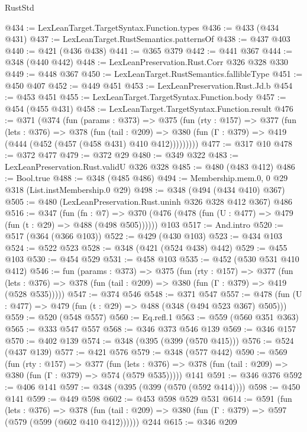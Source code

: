 \begin{lexlean}{RustStd}
\begin{coremodule}
@434 := LexLeanTarget.TargetSyntax.Function.types
@436 := @433 (@434 @431)
@437 := LexLeanTarget.RustSemantics.patternsOf
@438 := @437 @403
@440 := @421 (@436 @438)
@441 := @365 @379
@442 := @441 @367
@444 := @348 (@440 @442)
@448 := LexLeanPreservation.Rust.Corr @326 @328 @330
@449 := @448 @367
@450 := LexLeanTarget.RustSemantics.fallibleType
@451 := @450 @407
@452 := @449 @451
@453 := LexLeanPreservation.Rust.Jd.b
@454 := @453 @451
@455 := LexLeanTarget.TargetSyntax.Function.body
@457 := @454 (@455 @431)
@458 := LexLeanTarget.TargetSyntax.Function.result
@476 := @371
    (@374
      (fun (params : @373) =>
      @375
        (fun (rty : @157) =>
        @377
          (fun (lets : @376) =>
          @378
            (fun (tail : @209) =>
            @380 (fun (Γ : @379) => @419 (@444 (@452 (@457 (@458 @431) @410 @412)))))))))
@477 := @317 @10
@478 := @372 @477
@479 := @372 @29
@480 := @349 @322
@483 := LexLeanPreservation.Rust.validU @326 @328
@485 := @480 (@483 @412)
@486 := Bool.true
@488 := @348 (@485 @486)
@494 := Membership.mem.{0, 0} @29 @318 (List.instMembership.{0} @29)
@498 := @348 (@494 (@434 @410) @367)
@505 := @480 (LexLeanPreservation.Rust.uninh @326 @328 @412 @367) @486
@516 := @347
    (fun (fn : @7) =>
    @370 (@476 (@478 (fun (U : @477) => @479 (fun (t : @29) => @488 (@498 @505))))))
    @103
@517 := And.intro
@520 := @517 (@364 (@366 @103))
@522 := @429 (@430 @103)
@523 := @434 @103
@524 := @522 @523
@528 := @348 (@421 (@524 @438) @442)
@529 := @455 @103
@530 := @454 @529
@531 := @458 @103
@535 := @452 (@530 @531 @410 @412)
@546 := fun (params : @373) =>
  @375
    (fun (rty : @157) =>
    @377
      (fun (lets : @376) => @378 (fun (tail : @209) => @380 (fun (Γ : @379) => @419 (@528 @535)))))
@547 := @374 @546
@548 := @371 @547
@557 := @478 (fun (U : @477) => @479 (fun (t : @29) => @488 (@348 (@494 @523 @367) @505)))
@559 := @520 (@548 @557)
@560 := Eq.refl.{1}
@563 := @559 (@560 @351 @363)
@565 := @333 @547 @557
@568 := @346 @373 @546 @139
@569 := @346 @157
@570 := @402 @139
@574 := @348 (@395 (@399 (@570 @415)))
@576 := @524 (@437 @139)
@577 := @421 @576
@579 := @348 (@577 @442)
@590 := @569
    (fun (rty : @157) =>
    @377
      (fun (lets : @376) => @378 (fun (tail : @209) => @380 (fun (Γ : @379) => @574 (@579 @535)))))
    @141
@591 := @346 @376
@592 := @406 @141
@597 := @348 (@395 (@399 (@570 (@592 @414))))
@598 := @450 @141
@599 := @449 @598
@602 := @453 @598 @529 @531
@614 := @591
    (fun (lets : @376) =>
    @378 (fun (tail : @209) => @380 (fun (Γ : @379) => @597 (@579 (@599 (@602 @410 @412))))))
    @244
@615 := @346 @209

\end{coremodule}
\end{lexlean}
